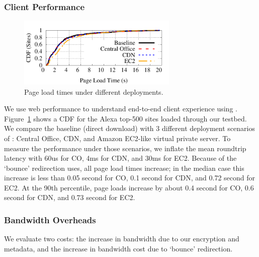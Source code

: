 \subsubsection{Client Performance}

\begin{figure}
  \hspace{-15pt}
  \centering
  \includegraphics[width=3in]{fig/e2e_compare}
  \caption[]{\label{fig:e2eloads} Page load times under different deployments.}
\end{figure}

We use web performance to understand end-to-end client experience using \sys.
Figure~\ref{fig:e2eloads} shows a CDF for the Alexa top-500 sites loaded through our testbed. We compare the baseline (direct download) with 3 different deployment scenarios of \sys: Central Office, CDN, and Amazon EC2-like virtual private server. To measure the performance under those scenarios, we inflate the mean roundtrip latency with 60us for CO, 4ms for CDN, and 30ms for EC2. 
Because of the `bounce' redirection \sys uses, all page load times increase; in the median case this increase is less than 0.05 second for CO, 0.1 second for CDN, and 0.72 second for EC2. At the 90th percentile, page loads increase by about 0.4 second for CO, 0.6 second for CDN, and 0.73 second for EC2.

\subsubsection{Bandwidth Overheads}
We evaluate two costs: the increase in bandwidth due to our encryption and metadata, and the increase in bandwidth cost due to `bounce' redirection.

